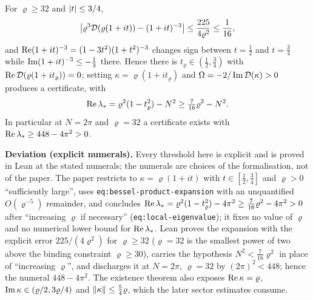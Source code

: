 \begin{lemma}[An admissible root on the segment $\kappa=\varrho(1+it)$]
  \label{lem:local:segment-root}
  \leanok
  For $\varrho\geq32$ and $\left\lvert t\right\rvert\leq3/4$,
  \[
    \left\lvert\varrho^3\mathcal D(\varrho(1+it))-(1+it)^{-3}\right\rvert\leq\frac{225}{4\varrho^2}
    \leq\frac1{16},
  \]
  and $\operatorname{Re}(1+it)^{-3}=(1-3t^2)(1+t^2)^{-3}$ changes sign between $t=\tfrac12$ and
  $t=\tfrac34$ while $\operatorname{Im}(1+it)^{-3}\leq-\tfrac13$ there.  Hence there is
  $t_\varrho\in(\tfrac12,\tfrac34)$ with $\operatorname{Re}\mathcal D(\varrho(1+it_\varrho))=0$; setting
  $\kappa=\varrho(1+it_\varrho)$ and $\Omega=-2/\operatorname{Im}\mathcal D(\kappa)>0$ produces a
  certificate, with
  \[
    \operatorname{Re}\lambda_*=\varrho^2(1-t_\varrho^2)-N^2\geq\tfrac7{16}\varrho^2-N^2 .
  \]
  In particular at $N=2\pi$ and $\varrho=32$ a certificate exists with
  $\operatorname{Re}\lambda_*\geq448-4\pi^2>0$.
\end{lemma}

\textbf{Deviation (explicit numerals).}  Every threshold here is explicit and is proved in
Lean at the stated numerals; the numerals are choices of the formalisation, not of the
paper.  The paper restricts to $\kappa=\varrho(1+it)$ with $t\in[\tfrac12,\tfrac34]$ and
$\varrho>0$ ``sufficiently large'', uses \texttt{eq:bessel-product-expansion} with an
unquantified $O(\varrho^{-5})$ remainder, and concludes
$\operatorname{Re}\lambda_*=\varrho^2(1-t_\varrho^2)-4\pi^2\geq\tfrac7{16}\varrho^2-4\pi^2>0$ after
``increasing $\varrho$ if necessary'' (\texttt{eq:local-eigenvalue}); it fixes no value of
$\varrho$ and no numerical lower bound for $\operatorname{Re}\lambda_*$.  Lean proves the expansion with
the explicit error $225/(4\varrho^2)$ for $\varrho\geq32$ ($\varrho=32$ is the smallest power
of two above the binding constraint $\varrho\geq30$), carries the hypothesis
$N^2<\tfrac7{16}\varrho^2$ in place of ``increasing $\varrho$'', and discharges it at
$N=2\pi$, $\varrho=32$ by $(2\pi)^2<448$; hence the numeral $448-4\pi^2$.  The
existence theorem also exposes $\operatorname{Re}\kappa=\varrho$, $\operatorname{Im}\kappa\in(\varrho/2,3\varrho/4)$
and $\left\|\kappa\right\|\leq\tfrac54\varrho$, which the later sector estimates consume.

